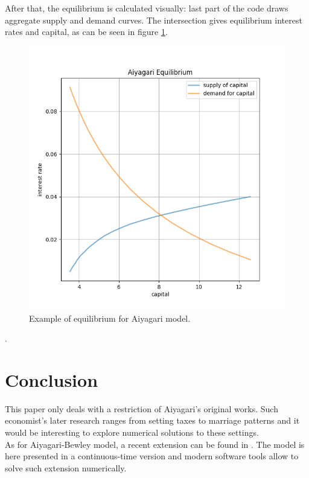 \documentclass[12pt]{article}
\begin{document}
After that, the equilibrium is calculated visually: last part of the code draws aggregate supply and demand curves. The intersection gives equilibrium interest rates and capital, as can be seen in figure \ref{plot:equilibrium}.
\begin{figure}[]
\label{plot:equilibrium}
\centering
\includegraphics[scale = 0.8]{equilibrium.png}
\caption{Example of equilibrium for Aiyagari model.}
\end{figure}
.

\newpage
\section{Conclusion}
This paper only deals with a restriction of Aiyagari's original works. Such economist's later research ranges from setting taxes to marriage patterns and it would be interesting to explore numerical solutions to these settings. \\
As for Aiyagari-Bewley model, a recent extension can be found in \cite{aiyacont}. The model is here presented in a continuous-time version and modern software tools allow to solve such extension numerically.

\newpage
\listoffigures
\end{document}
